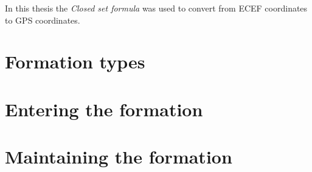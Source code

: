 In this thesis the \textit{Closed set formula} was used to convert from ECEF
coordinates to GPS coordinates.

\section{Formation types}
\label{sec::formation-types}

\section{Entering the formation}
\label{sec:formation-entering}

\section{Maintaining the formation}
\label{sec:formation-maintainig}
